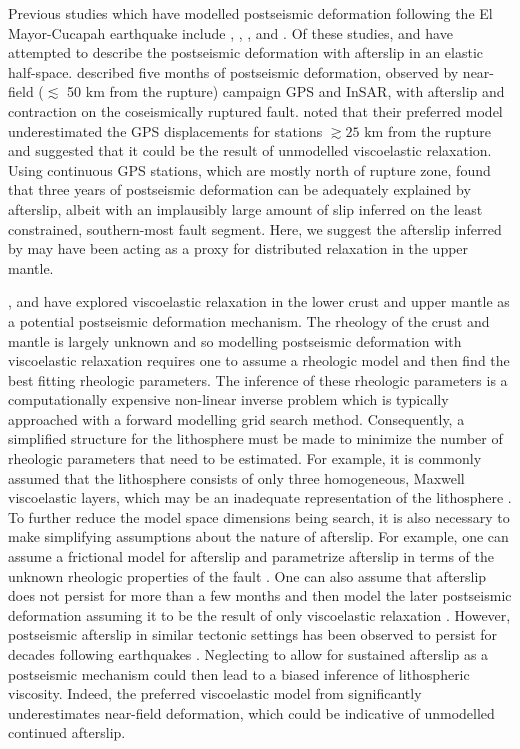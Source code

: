 \documentclass[review]{elsarticle}
\begin{document}
Previous studies which have modelled postseismic deformation following the El Mayor-Cucapah earthquake include \citet{Pollitz2012}, \citet{Gonzalez-ortega2014}, \citet{Spinler2015}, and \citet{Rollins2015}. Of these studies, \citet{Gonzalez-ortega2014} and \citet{Rollins2015} have attempted to describe the postseismic deformation with afterslip in an elastic half-space.  \citet{Gonzalez-ortega2014} described five months of postseismic deformation, observed by near-field ($\lesssim$ 50 km from the rupture) campaign GPS and InSAR, with afterslip and contraction on the coseismically ruptured fault. \citet{Gonzalez-ortega2014} noted that their preferred model underestimated the GPS displacements for stations $\gtrsim 25$ km from the rupture and suggested that it could be the result of unmodelled viscoelastic relaxation.  Using continuous GPS stations, which are mostly north of rupture zone, \citet{Rollins2015} found that three years of postseismic deformation can be adequately explained by afterslip, albeit with an implausibly large amount of slip inferred on the least constrained, southern-most fault segment. Here, we suggest the afterslip inferred by \citet{Rollins2015} may have been acting as a proxy for distributed relaxation in the upper mantle. 

\citet{Pollitz2012}, \citet{Rollins2015} and \citet{Spinler2015} have explored viscoelastic relaxation in the lower crust and upper mantle as a potential postseismic deformation mechanism. The rheology of the crust and mantle is largely unknown and so modelling postseismic deformation with viscoelastic relaxation requires one to assume a rheologic model and then find the best fitting rheologic parameters.  The inference of these rheologic parameters is a computationally expensive non-linear inverse problem which is typically approached with a forward modelling grid search method.  Consequently, a simplified structure for the lithosphere must be made to minimize the number of rheologic parameters that need to be estimated.  For example, it is commonly assumed that the lithosphere consists of only three homogeneous, Maxwell viscoelastic layers, which may be an inadequate representation of the lithosphere \citep{Riva2009,Hines2013}. To further reduce the model space dimensions being search, it is also necessary to make simplifying assumptions about the nature of afterslip. For example, one can assume a frictional model for afterslip and parametrize afterslip in terms of the unknown rheologic properties of the fault \citep[e.g.][]{Johnson2009,Johnson2004}. One can also assume that afterslip does not persist for more than a few months and then model the later postseismic deformation assuming it to be the result of only viscoelastic relaxation \citep[e.g.][]{Pollitz2012,Spinler2015}. However, postseismic afterslip in similar tectonic settings has been observed to persist for decades following earthquakes \citep{Cakir2012,Cetin2014}. Neglecting to allow for sustained afterslip as a postseismic mechanism could then lead to a biased inference of lithospheric viscosity. Indeed, the preferred viscoelastic model from \citet{Pollitz2012} significantly underestimates near-field deformation, which could be indicative of unmodelled continued afterslip.
\end{document}
